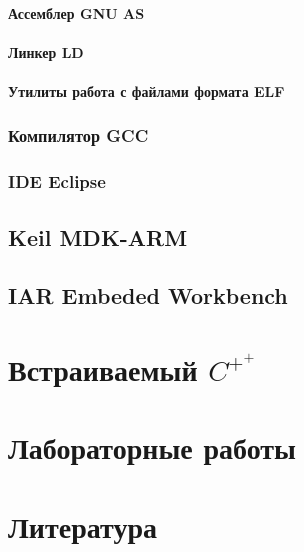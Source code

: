 \documentclass[oneside]{book}
\newcommand{\cpp}{$C^{+^{+}}$}
\begin{document}
\subsection{Ассемблер GNU AS}
\subsection{Линкер LD}
\subsection{Утилиты работа с файлами формата ELF}
\section{Компилятор GCC}
\section{IDE Eclipse}
\chapter{Keil MDK-ARM}
\chapter{IAR Embeded Workbench}

\part{Встраиваемый \cpp}

\part{Лабораторные работы}

\part{Литература}
\end{document}
